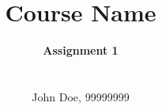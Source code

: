 \documentclass[a4paper,11pt,article,oneside,final]{memoir}
\title{Course Name}
\author{
  {\noindent\HUGE\bfseries Assignment 1} \\ \\ \\
  John Doe, 99999999 \\
}
\begin{document}
\sloppy
\maketitle


\end{document}
